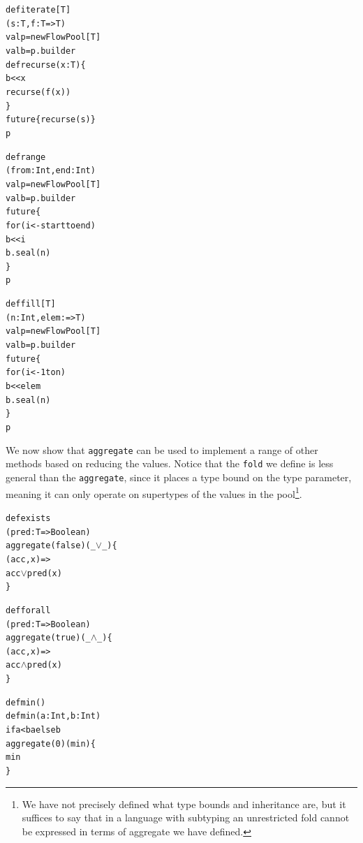 \documentclass[runningheads,a4paper]{llncs}
\begin{document}
\begin{minipage}[b]{3.75 cm}
\begin{alltt}
{\scriptsize
def iterate[T]
  (s: T, f: T => T)
  val p = new FlowPool[T]
  val b = p.builder
  def recurse(x: T) \{
    b << x
    recurse(f(x))
  \}
  future \{ recurse(s) \}
  p

}
\end{alltt}
\end{minipage}
\begin{minipage}[b]{4 cm}
\begin{alltt}
{\scriptsize
def range
  (from: Int, end: Int)
  val p = new FlowPool[T]
  val b = p.builder
  future \{
    for (i <- start to end)
      b << i
    b.seal(n)
  \}
  p

}
\end{alltt}
\end{minipage}
\begin{minipage}[b]{4 cm}
\begin{alltt}
{\scriptsize
def fill[T]
  (n: Int, elem: =>T)
  val p = new FlowPool[T]
  val b = p.builder
  future \{
    for (i <- 1 to n)
      b << elem
    b.seal(n)
  \}
  p

}
\end{alltt}
\end{minipage}

We now show that \verb=aggregate= can be used to implement a range of
other methods based on reducing the values.
Notice that the \verb=fold= we define is less general than the
\verb=aggregate=, since it places a type bound on the type parameter,
meaning it can only operate on supertypes of the values in the
pool\footnote{We have not precisely defined what type bounds and
inheritance are, but it suffices to say that in a language with
subtyping an unrestricted fold cannot be expressed in terms of
aggregate we have defined.}.

\noindent
\begin{minipage}[b]{3.9 cm}
\begin{alltt}
{\scriptsize
def exists
  (pred: T => Boolean)
  aggregate(false)(_ \(\vee\) _) \{
    (acc, x) =>
    acc \(\vee\) pred(x)
  \}


}
\end{alltt}
\end{minipage}
\begin{minipage}[b]{3.9 cm}
\begin{alltt}
{\scriptsize
def forall
  (pred: T => Boolean)
  aggregate(true)(_ \(\wedge\) _) \{
    (acc, x) =>
    acc \(\wedge\) pred(x)
  \}


}
\end{alltt}
\end{minipage}
\begin{minipage}[b]{3.9 cm}
\begin{alltt}
{\scriptsize
def min()
  def min(a: Int, b: Int)
    if a < b a else b
  aggregate(0)(min) \{
    min
  \}


}
\end{alltt}
\end{minipage}
\end{document}
